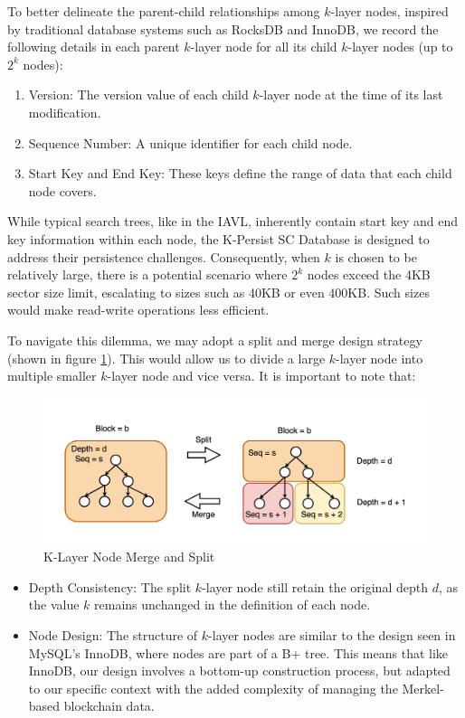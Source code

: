 To better delineate the parent-child relationships among $k$-layer nodes, inspired by traditional database systems such as RocksDB and InnoDB, we record the following details in each parent $k$-layer node for all its child $k$-layer nodes (up to $2^k$ nodes):

\begin{enumerate}
    \item Version: The version value of each child $k$-layer node at the time of its last modification.
    \item Sequence Number: A unique identifier for each child node.
    \item Start Key and End Key: These keys define the range of data that each child node covers.
\end{enumerate}

While typical search trees, like in the IAVL, inherently contain start key and end key information within each node, the K-Persist SC Database is designed to address their persistence challenges. Consequently, when $k$ is chosen to be relatively large, there is a potential scenario where $2^k$ nodes exceed the 4KB sector size limit, escalating to sizes such as 40KB or even 400KB. Such sizes would make read-write operations less efficient.

To navigate this dilemma, we may adopt a split and merge design strategy (shown in figure \ref{fig:k_layer_node_merge_split}). This would allow us to divide a large $k$-layer node into multiple smaller $k$-layer node and vice versa. It is important to note that:

\begin{figure}[htp]
    \centering
    \includegraphics[width=\columnwidth]{sections/images/k-persist-layer-merge-split.png}
    \caption{K-Layer Node Merge and Split}
    \label{fig:k_layer_node_merge_split}
\end{figure}

\begin{itemize}
    \item Depth Consistency: The split $k$-layer node still retain the original depth $d$, as the value $k$ remains unchanged in the definition of each node.
    \item Node Design: The structure of $k$-layer nodes are similar to the design seen in MySQL's InnoDB\cite{mysql_innodb_architecture}, where nodes are part of a B+ tree. This means that like InnoDB, our design involves a bottom-up construction process, but adapted to our specific context with the added complexity of managing the Merkel-based blockchain data.
\end{itemize}


